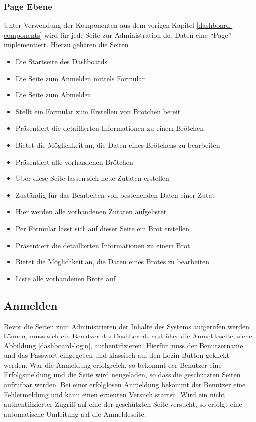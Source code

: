 \subsubsection{Page Ebene}
Unter Verwendung der Komponenten aus dem vorigen Kapitel \ref{dashboard-components} wird für jede Seite zur Administration der Daten eine \enquote{Page} implementiert. Hierzu gehören die Seiten
\begin{itemize}
	\item {} Die Startseite des Dashboards
	\item {} Die Seite zum Anmelden mittels Formular
	\item {} Die Seite zum Abmelden
	\item {} Stellt ein Formular zum Erstellen von Brötchen bereit
	\item {} Präsentiert die detaillierten Informationen zu einem Brötchen
	\item {} Bietet die Möglichkeit an, die Daten eines Brötchens zu bearbeiten
	\item {} Präsentiert alle vorhandenen Brötchen
	\item {} Über diese Seite lassen sich neue Zutaten erstellen
	\item {} Zuständig für das Bearbeiten von bestehenden Daten einer Zutat
	\item {} Hier werden alle vorhandenen Zutaten aufgelistet
	\item {} Per Formular lässt sich auf dieser Seite ein Brot erstellen
	\item {} Präsentiert die detaillierten Informationen zu einem Brot
	\item {} Bietet die Möglichkeit an, die Daten eines Brotes zu bearbeiten
	\item {} Liste alle vorhandenen Brote auf
\end{itemize}

\clearpage

\subsection{Anmelden}
Bevor die Seiten zum Administrieren der Inhalte des Systems aufgerufen werden können, muss sich ein Benutzer des Dashboards erst über die Anmeldeseite, siehe Abbildung \ref{dashboard-login}, authentifizieren. Hierfür muss der Benutzername und das Passwort eingegeben und klassisch auf den Login-Button geklickt werden. War die Anmeldung erfolgreich, so bekommt der Benutzer eine Erfolgsmeldung und die Seite wird neugeladen, so dass die geschützten Seiten aufrufbar werden. Bei einer erfolglosen Anmeldung bekommt der Benutzer eine Fehlermeldung und kann einen erneuten Versuch starten. Wird ein nicht authentifizierter Zugriff auf eine der geschützten Seite versucht, so erfolgt eine automatische Umleitung auf die Anmeldeseite.

